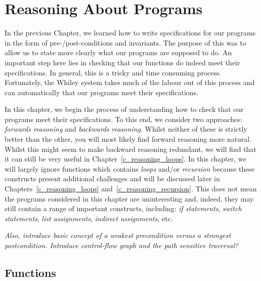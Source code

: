 \chapter{Reasoning About Programs}
In the previous Chapter, we learned how to write specifications for our programs in the form of pre-/post-conditions and invariants.  The purpose of this was to allow us to state more clearly what our programs are supposed to do.  An important step here lies in checking that our functions do indeed meet their specifications.  In general, this is a tricky and time consuming process.  Fortunately, the Whiley system takes much of the labour out of this process and can automatically that our programs meet their specifications.  

In this chapter, we begin the process of understanding how to check that our programs meet their specifications.  To this end, we consider two approaches: {\em forwards reasoning} and {\em backwards reasoning}.  Whilst neither of these is strictly better than the other, you will most likely find forward reasoning more natural.  Whilst this might seem to make backward reasoning redundant, we will find that it can still be very useful in Chapter~\ref{c_reasoning_loops}.  In this chapter, we will largely ignore functions which contains {\em loops} and/or {\em recursion} because these constructs present additional challenges and will be discussed later in Chapters~\ref{c_reasoning_loops} and~\ref{c_reasoning_recursion}.  This does not mean the programs considered in this chapter are uninteresting and, indeed, they may still contain a range of important constructs, including: {\em if statements}, {\em switch statements}, {\em list assignments}, {\em indirect assignments}, etc.

{\em Also, introduce basic concept of a weakest precondition versus a strongest postcondition.  Introduce control-flow graph and the path sensitive traversal?}

\section{Functions}

